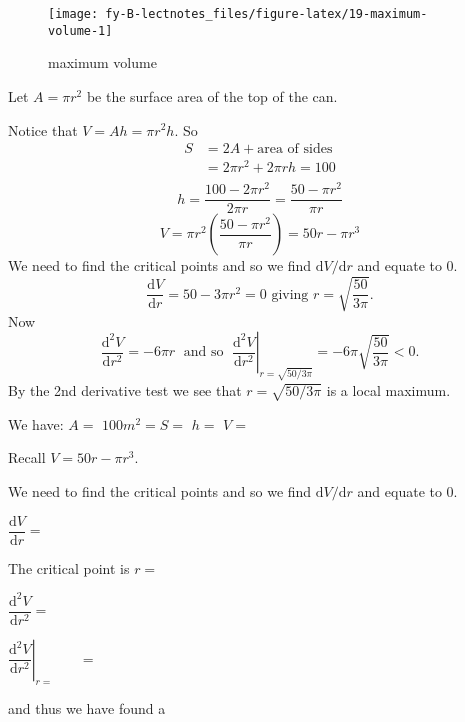 \documentclass[
  11pt,
  oneside]{book}
\newcommand{\slide}{}
\theoremstyle{definition}
\theoremstyle{definition}
\theoremstyle{definition}
\theoremstyle{definition}
\theoremstyle{remark}
\begin{document}
\begin{figure}

{\centering \texttt{[image: fy-B-lectnotes\_files/figure-latex/19-maximum-volume-1]} 

}

\caption{maximum volume}\label{fig:19-maximum-volume}
\end{figure}
\slide

\begin{notslides}

Let \(A=\pi r^2\) be the surface area of the top of the can.

Notice that \(V = Ah = \pi r^2h\). So
\[
\begin{array}{rl}
S&=2A + \text{area of sides}\\
&=2\pi r^2 + 2\pi rh = 100\\
\end{array}
\]
\[
h=\frac{100-2\pi r^2}{2\pi r}=\frac{50-\pi r^2}{\pi r}
\]
\[
V=\pi r^2\left(\frac{50-\pi r^2}{\pi r}\right) = 50r -\pi r^3
\]
We need to find the critical points and so we find \(\mathrm{d}V/\mathrm{d} r\) and equate to 0.
\[
\frac{\mathrm{d} V}{\mathrm{d} r} = 50-3\pi r^2 = 0\text{ giving }r = \sqrt{\frac{50}{3\pi}}.
\]
Now
\[
\frac{\mathrm{d}^2 V}{\mathrm{d}r^2} = -6\pi r\;\text{ and so }\;\left.\frac{\mathrm{d}^2 V}{\mathrm{d}r^2}\right\vert_{r=\sqrt{50/3\pi}} = -6\pi\sqrt{\frac{50}{3\pi}}<0.
\]
By the 2nd derivative test we see that \(r=\sqrt{50/3\pi}\) is a local maximum.

\end{notslides}

\begin{slidesonly}

We have: \(A=\)
\vfill
\(100m^2=S=\)
\vfill
\(h=\)
\vfill
\(V=\)
\vfill
\slide
Recall \(V=50r-\pi r^3\).

We need to find the critical points and so we find \(\mathrm{d}V/\mathrm{d} r\) and equate to 0.

\(\dfrac{\mathrm{d} V}{\mathrm{d} r} =\)

\vfill

The critical point is \(r=\)

\vfill

\(\dfrac{\mathrm{d}^2 V}{\mathrm{d}r^2} =\)

\vfill

\(\left.\dfrac{\mathrm{d}^2 V}{\mathrm{d}r^2}\right\vert_{r=\phantom{adsfa}} =\)

and thus we have found a
\slide

\end{slidesonly}
\end{document}
